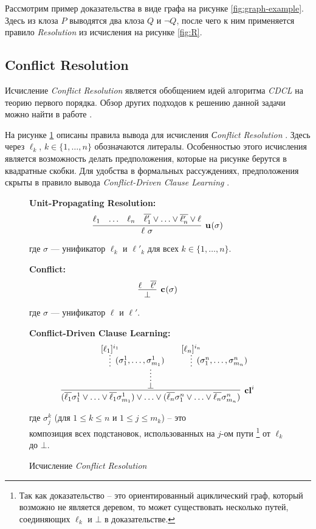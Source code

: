 \begin{example}
Рассмотрим пример доказательства в виде графа на рисунке \ref{fig:graph-example}. Здесь из клоза $P$ выводятся два клоза $Q$ и $\neg Q$, после чего к ним применяется правило \emph{Resolution} из исчисления на рисунке \ref{fig:R}.
\end{example}

\subsection{Conflict Resolution}
\label{sec:CR}
Исчисление \emph{Conflict Resolution} является обобщением идей алгоритма \emph{CDCL} на теорию первого порядка. Обзор других подходов к решению данной задачи можно найти в работе \cite{DBLP:journals/corr/SlaneyP16}.

На рисунке \ref{fig:CR} описаны правила вывода для исчисления \emph{Сonflict Resolution} \cite{DBLP:journals/corr/SlaneyP16}. Здесь через $\ell_k$, $k \in \{1, \ldots, n\}$ обозначаются литералы. Особенностью этого исчисления является возможность делать предположения, которые на рисунке берутся в квадратные скобки. Для удобства в формальных рассуждениях, предположения скрыты в правило вывода \emph{Conflict-Driven Clause Learning} \cite{MarquesSilva2009ConflictDrivenCL}.

\begin{figure}
\begin{calculus}
\centering
\textbf{Unit-Propagating Resolution:}
$$
\infer[\upr{}{\sigma}]
	  {\ell~\sigma}
      {\ell_1 & \ldots & \ell_n & \overline{\ell'_1} \vee \ldots \vee \overline{\ell'_n} \vee \ell}
$$

где $\sigma$ --- унификатор $\ell_k$ и $\ell'_k$ для всех $k \in \{1, \ldots, n \}$.

\bigskip

\textbf{Conflict:}
$$
\infer[\confl{}{\sigma}]
      {\bot}
      {\ell & \overline{\ell'}}
$$

где $\sigma$ --- унификатор $\ell$ и $\ell'$.

\bigskip

\textbf{Conflict-Driven Clause Learning:}
$$
\infer[\cdcl{}{i}]
      {(\overline{\ell_1} \sigma^1_1 \vee \ldots \vee \overline{\ell_1} \sigma^1_{m_1}) \vee \ldots \vee (\overline{\ell_n} \sigma^n_1 \vee \ldots \vee \overline{\ell_n} \sigma^n_{m_n})
      }
	  {\infer*{\bot}{\infer*[(\sigma_1^1,\ldots,\sigma_{m_1}^1)]{}{[\ell_1]^{\dls{i}{1}}} &  & \infer*[(\sigma_1^n,\ldots,\sigma_{m_n}^n)]{}{[\ell_n]^{\dls{i}{n}}}}
      }
$$

где $\sigma^k_j$ (для $1 \leq k \leq n$ и $1 \leq j \leq m_k$) -- это \\
композиция всех подстановок, использованных на $j$-ом пути \footnote{Так как
  доказательство -- это ориентированный ациклический граф, который возможно не
  является деревом, то может существовать несколько путей, соединяющих $\ell_k$ и
  $\bot$ в доказательстве.} от $\ell_k$ до $\bot$.

\end{calculus}
\caption{Исчисление \emph{Conflict Resolution}}
\label{fig:CR}
\end{figure}


